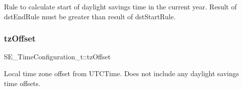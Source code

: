 Rule to calculate start of daylight savings time in the current year. Result of dst\+End\+Rule must be greater than result of dst\+Start\+Rule. \mbox{\label{group__TimeConfiguration_ga2828faf061be8b3195d89dfbf7cb2b02}} 
\subsubsection{\texorpdfstring{tz\+Offset}{tzOffset}}
{\footnotesize\ttfamily S\+E\+\_\+\+Time\+Configuration\+\_\+t\+::tz\+Offset}

Local time zone offset from U\+T\+C\+Time. Does not include any daylight savings time offsets. 